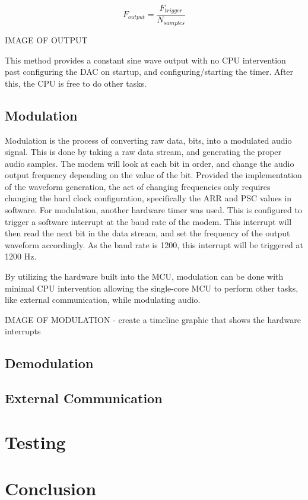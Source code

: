 \documentclass[notitlepage]{report}
\begin{document}
\[
  F_{output} = \frac{F_{trigger}}{N_{samples}}
\]

IMAGE OF OUTPUT

This method provides a constant sine wave output with no CPU intervention past configuring the DAC on startup, and configuring/starting the timer. After this, the CPU is free to do other tasks.

\subsection{Modulation}

Modulation is the process of converting raw data, bits, into a modulated audio signal. This is done by taking a raw data stream, and generating the proper audio samples. The modem will look at each bit in order, and change the audio output frequency depending on the value of the bit. Provided the implementation of the waveform generation, the act of changing frequencies only requires changing the hard clock configuration, specifically the ARR and PSC values in software. For modulation, another hardware timer was used. This is configured to trigger a software interrupt at the baud rate of the modem. This interrupt will then read the next bit in the data stream, and set the frequency of the output waveform accordingly. As the baud rate is 1200, this interrupt will be triggered at 1200 Hz.

By utilizing the hardware built into the MCU, modulation can be done with minimal CPU intervention allowing the single-core MCU to perform other tasks, like external communication, while modulating audio.

IMAGE OF MODULATION - create a timeline graphic that shows the hardware interrupts

\subsection{Demodulation}

\subsection{External Communication}

\section{Testing}

\section{Conclusion}



\end{document}

